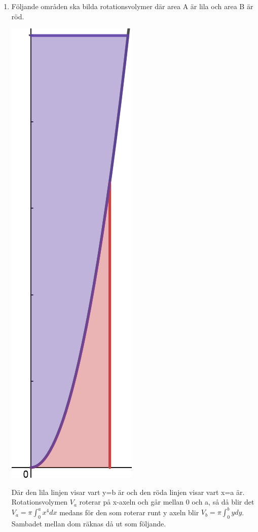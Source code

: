 \documentclass[a4paper,12pt]{article}
\begin{document}
\begin{enumerate}
    \item Följande områden ska bilda rotationsvolymer där area A är lila
    och area B är röd. 
    \begin{center}
        \includegraphics[scale=0.4]{Figur 6.png}
    \end{center}

    Där den lila linjen visar vart y=b är och den röda linjen
    visar vart x=a är. Rotationsvolymen $V_a$ roterar på x-axeln och går
    mellan 0 och a, så då blir det $V_a=\pi\int_0^ax^4dx$ medans för den som
    roterar runt y axeln blir $V_b=\pi\int_0^bydy$. Sambadet mellan dom räknas
    då ut som följande.


\end{enumerate}
\end{document}
